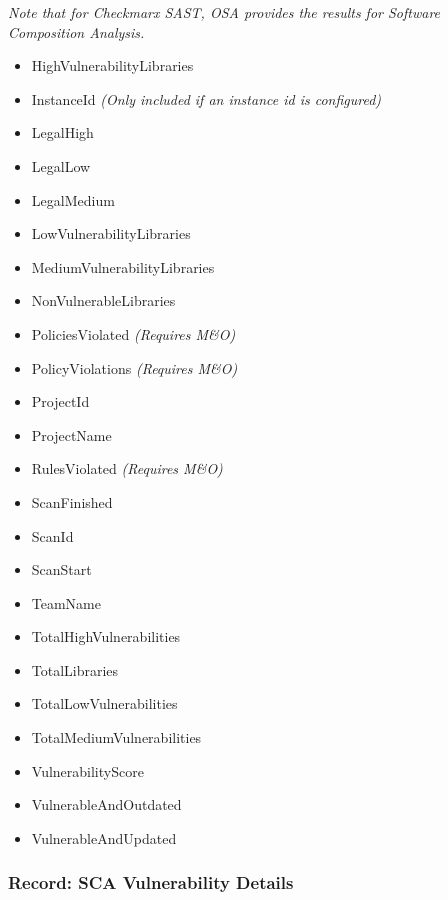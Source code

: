 \textit{Note that for Checkmarx SAST, OSA provides the results for Software Composition Analysis.}

\begin{itemize}
    \item HighVulnerabilityLibraries
    \item InstanceId \textit{(Only included if an instance id is configured)}
    \item LegalHigh
    \item LegalLow
    \item LegalMedium
    \item LowVulnerabilityLibraries
    \item MediumVulnerabilityLibraries
    \item NonVulnerableLibraries
    \item PoliciesViolated \textit{(Requires M\&O)}
    \item PolicyViolations \textit{(Requires M\&O)}
    \item ProjectId
    \item ProjectName
    \item RulesViolated \textit{(Requires M\&O)}
    \item ScanFinished
    \item ScanId
    \item ScanStart
    \item TeamName
    \item TotalHighVulnerabilities
    \item TotalLibraries
    \item TotalLowVulnerabilities
    \item TotalMediumVulnerabilities
    \item VulnerabilityScore
    \item VulnerableAndOutdated
    \item VulnerableAndUpdated
\end{itemize}

\subsubsection{Record: SCA Vulnerability Details}



